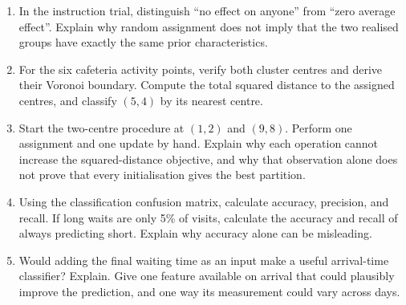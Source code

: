 \begin{enumerate}
\item In the instruction trial, distinguish ``no effect on anyone'' from
``zero average effect''. Explain why random assignment does not imply
that the two realised groups have exactly the same prior characteristics.
\item For the six cafeteria activity points, verify both cluster centres
and derive their Voronoi boundary. Compute the total squared distance to
the assigned centres, and classify $(5,4)$ by its nearest centre.
\item Start the two-centre procedure at $(1,2)$ and $(9,8)$. Perform one
assignment and one update by hand. Explain why each operation cannot
increase the squared-distance objective, and why that observation alone
does not prove that every initialisation gives the best partition.
\item Using the classification confusion matrix, calculate accuracy,
precision, and recall. If long waits are only 5\% of visits, calculate the
accuracy and recall of always predicting short. Explain why accuracy alone
can be misleading.
\item Would adding the final waiting time as an input make a useful
arrival-time classifier? Explain. Give one feature available on arrival
that could plausibly improve the prediction, and one way its measurement
could vary across days.
\end{enumerate}
